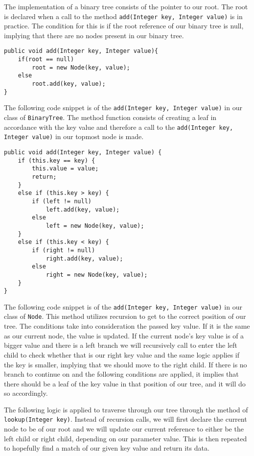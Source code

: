 \documentclass[a4paper,11pt]{article}
\begin{document}
        The implementation of a binary tree consists of the pointer to our root. The root is declared when a call to the method \texttt{add(Integer key, Integer value)} is in practice. The condition for this is if the root reference of our binary tree is null, implying that there are no nodes present in our binary tree.
\begin{verbatim}
public void add(Integer key, Integer value){
    if(root == null)
        root = new Node(key, value);
    else
        root.add(key, value);
}
\end{verbatim}
        The following code snippet is of the \texttt{add(Integer key, Integer value)} in our class of \texttt{BinaryTree}. The method function consists of creating a leaf in accordance with the key value and therefore a call to the \texttt{add(Integer key, Integer value)} in our topmost node is made.
\begin{verbatim}
public void add(Integer key, Integer value) {
    if (this.key == key) {
        this.value = value;
        return;
    }   
    else if (this.key > key) {
        if (left != null)
            left.add(key, value);
        else
            left = new Node(key, value);
    }
    else if (this.key < key) {
        if (right != null)
            right.add(key, value);
        else
            right = new Node(key, value);
    }
}
\end{verbatim}
        The following code snippet is of the \texttt{add(Integer key, Integer value)} in our class of \texttt{Node}. This method utilizes recursion to get to the correct position of our tree. The conditions take into consideration the passed key value. If it is the same as our current node, the value is updated. If the current node's key value is of a bigger value and there is a left branch we will recursively call to enter the left child to check whether that is our right key value and the same logic applies if the key is smaller, implying that we should move to the right child. If there is no branch to continue on and the following conditions are applied, it implies that there should be a leaf of the key value in that position of our tree, and it will do so accordingly.

        The following logic is applied to traverse through our tree through the method of \texttt{lookup(Integer key)}. Instead of recursion calls, we will first declare the current node to be of our root and we will update our current reference to either be the left child or right child, depending on our parameter value. This is then repeated to hopefully find a match of our given key value and return its data.
        
\end{document}
